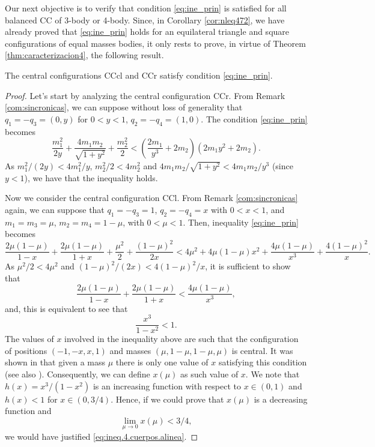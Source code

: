 \documentclass[smallcondensed]{svjour3}
\begin{document}
Our next objective is to verify that condition \eqref{eq:ine_prin} is satisfied for all balanced CC of 3-body or 4-body. Since,  in  Corollary \ref{cor:nleq472}, we have already proved that \eqref{eq:ine_prin} holds for an equilateral triangle and square configurations of equal masses bodies, it only rests to prove, in virtue of Theorem \ref{thm:caracterizacion4}, the following result.



\begin{theorem}\label{thm:CC.3.4.satis.cond.adm}
The central configurations CCcl and CCr satisfy condition \eqref{eq:ine_prin}.
\end{theorem}



\begin{proof}

Let's start by analyzing the central configuration CCr. From  Remark \ref{com:sincronicas}, we can suppose without loss of generality that $ q_1 = -q_3 = (0, y) $ for $ 0<y<1 $, $ q_2 = -q_4 = (1,0) $. The condition \eqref{eq:ine_prin} becomes
\[\frac{m_1^2}{2y}+\frac{4m_1m_2}{\sqrt{1+y^2}}+\frac{m_2^2}{2}<\left(\frac{2m_1}{y^3}+2m_2\right) \left(2m_1y^2+2m_2\right).\]
As $m_1^2/(2y)<4m_1^2/y$, $m_2^2/2<4m_2^2$ and $4m_1m_2/\sqrt{1+y^2}<4m_1m_2/y^3$ (since $y<1$), we have that the inequality holds.

 Now we consider the central configuration CCl. From Remark \ref{com:sincronicas} again, we can suppose  that $q_1=-q_3=1$, $q_2=-q_4=x$ with $0<x<1$, and $m_1=m_3=\mu$, $m_2=m_4=1-\mu$, with $0<\mu<1$.  Then, inequality \eqref{eq:ine_prin} becomes
\[\frac{2\mu(1-\mu)}{1-x} +\frac{2\mu(1-\mu)}{1+x}+\frac{\mu^2}{2}+\frac{(1-\mu)^2}{2x}<4\mu^2+4\mu(1-\mu)x^2+\frac{4\mu(1-\mu)}{x^3}+\frac{4(1-\mu)^2}{x}.\]
As $ \mu ^ 2/2 <4 \mu^2$ and $ (1-\mu)^2/(2x)< 4(1-\mu)^2/x $, it is sufficient to show that
\[\frac{2\mu(1-\mu)}{1-x} +\frac{2\mu(1-\mu)}{1+x}<\frac{4\mu(1-\mu)}{x^3},\]
and, this is equivalent to see that
\begin{equation}\label{eq:ineq.4.cuerpos.alinea}
\frac{x^3}{1-x^2}<1.
\end{equation}
The values of $x$ involved in the  inequality above are such that the configuration of positions $(-1,-x,x,1)$ and masses $(\mu,1-\mu,1-\mu,\mu)$ is central. It was shown in \cite{moulton1910straight} that given a mass $\mu$ there is only one value of $x$ satisfying this condition (see also \cite{shoaib2011collinear}). Consequently, we can define $x(\mu)$ as such value of $x$.  We note that $h(x)=x^3/(1-x^2)$ is an increasing function with respect to $x\in (0,1)$ and $h(x)< 1$ for $x\in (0,3/4)$. Hence, if we could prove that $x(\mu)$ is a decreasing function and
\begin{equation}\label{eq:ineq.4.cuerpos.lim0}
\lim\limits_{\mu\to 0}x(\mu)<3/4,
\end{equation}
we would have justified \eqref {eq:ineq.4.cuerpos.alinea}.


\end{proof}
\end{document}

